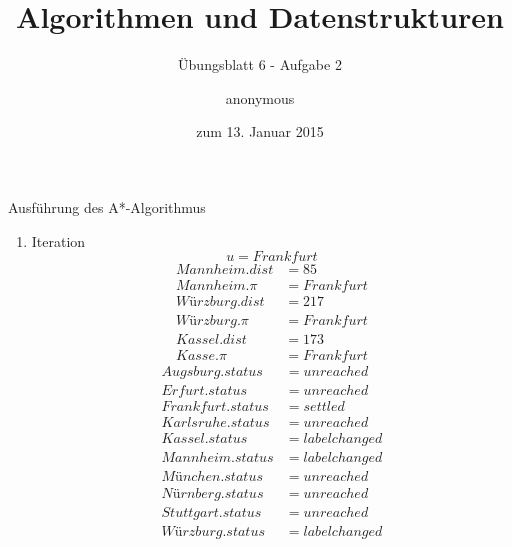 \documentclass[a4paper]{scrartcl}
\title{Algorithmen und Datenstrukturen}
\subtitle{Übungsblatt 6 - Aufgabe 2}
\author{
    anonymous
}
\date{zum 13. Januar 2015}
\begin{document}
\maketitle

Ausführung des A*-Algorithmus
\begin{enumerate}
    \item Iteration
        \begin{equation*}
            u = Frankfurt
        \end{equation*}
        \begin{align*}
            Mannheim.dist &= 85 \\
            Mannheim.\pi &= Frankfurt \\
            Würzburg.dist &= 217 \\
            Würzburg.\pi &= Frankfurt \\
            Kassel.dist &= 173 \\
            Kasse.\pi &= Frankfurt
        \end{align*}
        \begin{align*}
            Augsburg.status &= unreached \\
            Erfurt.status &= unreached \\
            Frankfurt.status &= settled \\
            Karlsruhe.status &= unreached \\
            Kassel.status &= labelchanged \\
            Mannheim.status &= labelchanged \\
            München.status &= unreached \\
            Nürnberg.status &= unreached \\
            Stuttgart.status &= unreached \\
            Würzburg.status &= labelchanged \\
        \end{align*}
        

\end{enumerate}
\end{document}
